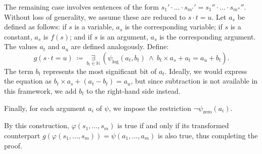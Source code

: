 \documentclass[12pt]{article}
\begin{document}
	The remaining case involves sentences of the form \(s_{1}' \cdot \ldots
	\cdot s_{m'}' = s_{1}'' \cdot \ldots \cdot s_{m''}''\). Without loss of
	generality, we assume these are reduced to \(s \cdot t = u\). Let \(a_{s}\)
	be defined as follows: if \(s\) is a variable, \(a_{s}\) is the
	corresponding variable; if \(s\) is a constant, \(a_{s}\) is \(f(s)\); and
	if \(s\) is an argument, \(a_{s}\) is the corresponding argument. The values
	\(a_{t}\) and \(a_{u}\) are defined analogously. Define:
	\[ g(s \cdot t = u) \ \coloneqq \ \underset{b_{t} \in \mathbb{N}}{\exists} \
	\left( \psi_{\text{log}}(a_{t}, b_{t}) \ \wedge \ b_{t} \times a_{s} + a_{t}
	= a_{u} + b_{t} \right) \text{.} \]
	The term \(b_{t}\) represents the most significant bit of \(a_{t}\).
	Ideally, we would express the equation as \(b_{t} \times a_{s} + (a_{t} -
	b_{t}) = a_{u}\), but since subtraction is not available in this framework,
	we add \(b_{t}\) to the right-hand side instead.
	
	\medskip
	
	Finally, for each argument \(a_{i}\) of \(\psi\), we impose the restriction
	\(\neg \psi_{\text{zero}}(a_{i})\).
	
	\medskip
	
	By this construction, \(\varphi(s_{1}, \ldots, s_{m})\) is true if and only
	if its transformed counterpart \(g(\varphi(s_{1}, \ldots, \allowbreak
	s_{m})) = \psi(a_{1}, \ldots, a_{m})\) is also true, thus completing the
	proof.
\end{document}
